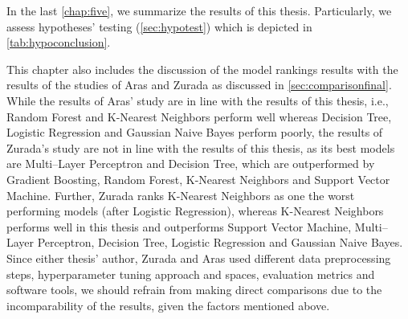 In the last \autoref{chap:five}, we summarize the results of this thesis. Particularly, we assess hypotheses' testing (\autoref{sec:hypotest}) which is depicted in  \autoref{tab:hypoconclusion}.

This chapter also includes the discussion of the model rankings results with the results of the studies of Aras \citep{serkan2021bagging} and Zurada \citep{zurada2014classification} as discussed in \autoref{sec:comparisonfinal}.
While the results of Aras' study are in line with the results of this thesis, i.e., Random Forest and K-Nearest Neighbors perform well whereas Decision Tree, Logistic Regression and Gaussian Naive Bayes perform poorly,
the results of Zurada's study are not in line with the results of this thesis, as its best models are Multi--Layer Perceptron and Decision Tree, which are outperformed by Gradient Boosting, Random Forest, K-Nearest Neighbors and Support Vector Machine.
Further, Zurada ranks K-Nearest Neighbors as one the worst performing models (after Logistic Regression), whereas K-Nearest Neighbors performs well in this thesis and outperforms Support Vector Machine, Multi--Layer Perceptron, Decision Tree, Logistic Regression and Gaussian Naive Bayes.
Since either thesis' author, Zurada and Aras used different data preprocessing steps, hyperparameter tuning approach and spaces, evaluation metrics and software tools, we should refrain from making direct comparisons due to the incomparability of the results, given the factors mentioned above.

